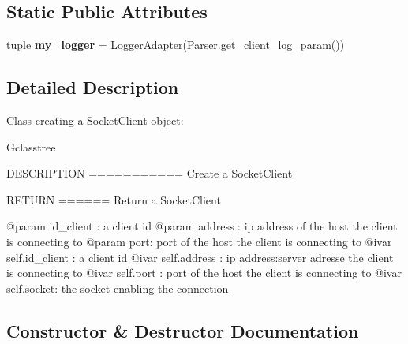 \subsection*{Static Public Attributes}
\begin{DoxyCompactItemize}
\item 
\hypertarget{classorg_1_1swallow__labs_1_1model_1_1_socket_client_1_1_socket_client_adae69670203178ce48555e08638215f7}{}tuple {\bfseries my\+\_\+logger} = Logger\+Adapter(Parser.\+get\+\_\+client\+\_\+log\+\_\+param())\label{classorg_1_1swallow__labs_1_1model_1_1_socket_client_1_1_socket_client_adae69670203178ce48555e08638215f7}

\end{DoxyCompactItemize}


\subsection{Detailed Description}
\begin{DoxyVerb}Class creating a SocketClient object:

G{classtree}

DESCRIPTION
===========
Create a SocketClient

RETURN
======
Return a SocketClient

@param id_client : a client id
@param address : ip address of the host the client is connecting to
@param port: port of the host the client is connecting to
@ivar self.id_client : a client id
@ivar self.address : ip address:server adresse the client is connecting to
@ivar self.port : port of the host the client is connecting to
@ivar self.socket: the socket enabling the connection\end{DoxyVerb}
 

\subsection{Constructor \& Destructor Documentation}
\hypertarget{classorg_1_1swallow__labs_1_1model_1_1_socket_client_1_1_socket_client_a93c4e3fa3ba99d54ba6aeb4fcc0ed428}{}
